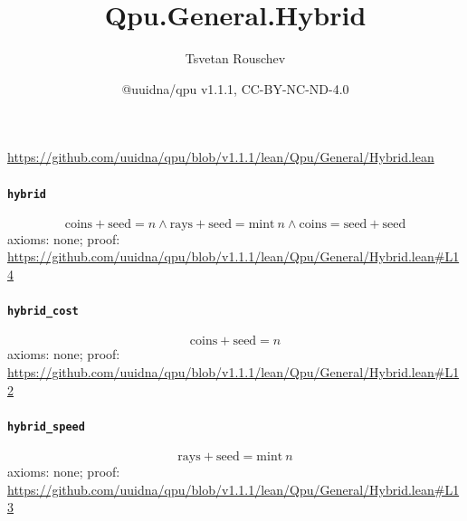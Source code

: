 \documentclass[11pt]{article}
\title{Qpu.General.Hybrid}
\author{Tsvetan Rouschev}
\date{@uuidna/qpu v1.1.1, CC-BY-NC-ND-4.0}
\begin{document}
\maketitle
\noindent\url{https://github.com/uuidna/qpu/blob/v1.1.1/lean/Qpu/General/Hybrid.lean}

\paragraph{\texttt{hybrid}}
\[ \mathrm{coins} + \mathrm{seed} = n \land \mathrm{rays} + \mathrm{seed} = \mathrm{mint}\ n \land \mathrm{coins} = \mathrm{seed} + \mathrm{seed} \]
\noindent axioms: none; proof: \url{https://github.com/uuidna/qpu/blob/v1.1.1/lean/Qpu/General/Hybrid.lean\#L14}

\paragraph{\texttt{hybrid\_cost}}
\[ \mathrm{coins} + \mathrm{seed} = n \]
\noindent axioms: none; proof: \url{https://github.com/uuidna/qpu/blob/v1.1.1/lean/Qpu/General/Hybrid.lean\#L12}

\paragraph{\texttt{hybrid\_speed}}
\[ \mathrm{rays} + \mathrm{seed} = \mathrm{mint}\ n \]
\noindent axioms: none; proof: \url{https://github.com/uuidna/qpu/blob/v1.1.1/lean/Qpu/General/Hybrid.lean\#L13}
\end{document}
